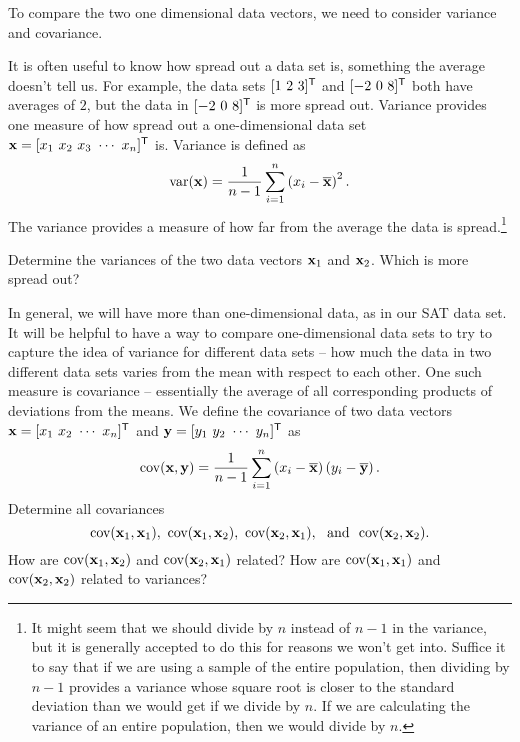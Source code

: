\begin{pactivity} \label{act:PCA_covariance} To compare the two one dimensional data vectors, we need to consider variance and covariance.
\ba
\item It is often useful to know how spread out a data set is, something the average doesn't tell us. For example, the data sets $[1 \ 2 \ 3]^{\mathsf{T}}$ and $[-2 \ 0 \ 8]^{\mathsf{T}}$ both have averages of $2$, but the data in $[-2 \ 0 \ 8]^{\mathsf{T}}$ is more spread out. Variance provides one measure of how spread out a one-dimensional data set $\vx = [x_1 \ x_2 \ x_3 \ \cdots \ x_n]^{\tr}$ is. Variance is defined as 
\[\text{var}(\mathbf{x}) = \frac{1}{n-1} \sum_{i=1}^{n} \left(x_i - \overline{\mathbf{x}} \right)^2.\]
The variance provides a measure of how far from the average the data is spread.\footnote{It might seem that we should divide by $n$ instead of $n-1$ in the variance, but it is generally accepted to do this for reasons we won't get into. Suffice it to say that if we are using a sample of the entire population, then dividing by $n-1$ provides a variance whose square root is closer to the standard deviation than we would get if we divide by $n$. If we are calculating the variance of an entire population, then we would divide by $n$.} %

Determine the variances of the two data vectors $\mathbf{x}_1$ and $\mathbf{x}_2$. Which is more spread out? 


\item In general, we will have more than one-dimensional data, as in our SAT data set. It will be helpful to have a way to compare one-dimensional data sets to try to capture the idea of variance for different data sets -- how much the data in two different data sets varies from the mean with respect to each other. One such measure is covariance -- essentially the average of all corresponding products of deviations from the means. We define the covariance of two data vectors $\vx = [x_1 \ x_2 \ \cdots \ x_n]^{\tr}$ and $\vy = [y_1 \ y_2 \ \cdots \ y_n]^{\tr}$ as 
\[\text{cov}(\mathbf{x},\mathbf{y}) = \frac{1}{n-1} \sum_{i=1}^{n} \left(x_i-\overline{\mathbf{x}}\right)\left(y_i-\overline{\mathbf{y}}\right).\]
Determine all covariances 
\[\text{cov}(\mathbf{x}_1,\mathbf{x}_1), \  \text{cov}(\mathbf{x}_1,\mathbf{x}_2), \  \text{cov}(\mathbf{x}_2,\mathbf{x}_1), \ \text{ and } \ \text{cov}(\mathbf{x}_2,\mathbf{x}_2).\] How are $\text{cov}(\mathbf{x}_1,\mathbf{x}_2)$ and $\text{cov}(\mathbf{x}_2,\mathbf{x}_1)$ related? How are  $\text{cov}(\mathbf{x}_1,\mathbf{x}_1)$ and $\text{cov}(\mathbf{x}_2,\mathbf{x}_2)$ related to variances? 



\end{pactivity}
